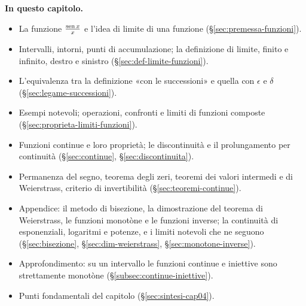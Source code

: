 \medskip
\noindent\textbf{In questo capitolo.}
\begin{itemize}
  \item La funzione $\frac{\operatorname{sen} x}{x}$ e l'idea di limite di una funzione
  (\S\ref{sec:premessa-funzioni}).
  \item Intervalli, intorni, punti di accumulazione; la definizione di limite, finito e
  infinito, destro e sinistro (\S\ref{sec:def-limite-funzioni}).
  \item L'equivalenza tra la definizione «con le successioni» e quella con $\epsilon$ e
  $\delta$ (\S\ref{sec:legame-successioni}).
  \item Esempi notevoli; operazioni, confronti e limiti di funzioni composte
  (\S\ref{sec:proprieta-limiti-funzioni}).
  \item Funzioni continue e loro proprietà; le discontinuità e il prolungamento per
  continuità (\S\ref{sec:continue}, \S\ref{sec:discontinuita}).
  \item Permanenza del segno, teorema degli zeri, teoremi dei valori intermedi e di
  Weierstrass, criterio di invertibilità (\S\ref{sec:teoremi-continue}).
  \item Appendice: il metodo di bisezione, la dimostrazione del teorema di Weierstrass,
  le funzioni monotòne e le funzioni inverse; la continuità di esponenziali, logaritmi e
  potenze, e i limiti notevoli che ne seguono (\S\ref{sec:bisezione},
  \S\ref{sec:dim-weierstrass}, \S\ref{sec:monotone-inverse}).
  \item Approfondimento: su un intervallo le funzioni continue e iniettive sono
  strettamente monotòne (\S\ref{subsec:continue-iniettive}).
  \item Punti fondamentali del capitolo (\S\ref{sec:sintesi-cap04}).
\end{itemize}













